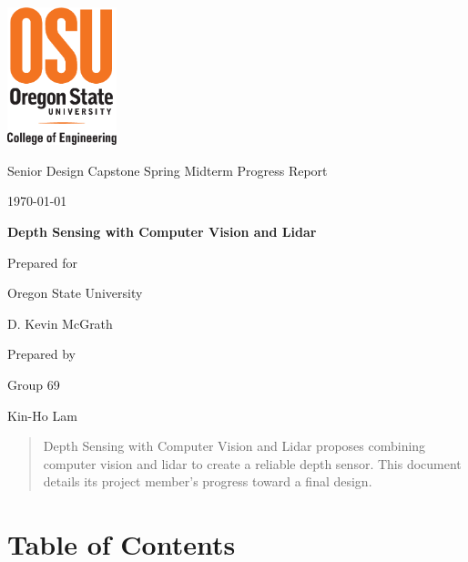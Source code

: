\documentclass[onecolumn, draftclsnofoot,10pt, compsoc]{IEEEtran}
\def \CapstoneTeamName{			}
\def \CapstoneTeamNumber{		69}
\def \GroupMemberOne{			Kin-Ho Lam}
\def \CapstoneProjectName{		Depth Sensing with Computer Vision and Lidar}
\def \CapstoneSponsorCompany{	Oregon State University}
\def \CapstoneSponsorPerson{	D. Kevin McGrath}
\def \DocType{
	Spring Midterm Progress Report
}
\newcommand{\NameSigPair}[1]{\par
	\makebox[2.75in][r]{#1} \hfil 	\makebox[3.25in]{\makebox[2.25in]{\hrulefill} \hfill		\makebox[.75in]{\hrulefill}}
	\par\vspace{-12pt} \textit{\tiny\noindent
		\makebox[2.75in]{} \hfil		\makebox[3.25in]{\makebox[2.25in][r]{Signature} \hfill	\makebox[.75in][r]{Date}}}}
\renewcommand{\NameSigPair}[1]{#1}
\begin{document}
	\begin{titlepage}
		\begin{singlespace}
			\centering
			\includegraphics[height=4cm,natwidth=345,natheight=435]{images/osu_logo.png}
			\hfill 
			\par\vspace{.2in}
			\centering
			\scshape{
				\huge Senior Design Capstone \DocType \par
				{\large\today}\par
				\vspace{.5in}
				\textbf{\Huge\CapstoneProjectName}\par
				\vfill
				{\large Prepared for}\par
				\Huge \CapstoneSponsorCompany\par
				\vspace{5pt}
				{\Large\NameSigPair{\CapstoneSponsorPerson}\par}
				{\large Prepared by }\par
				Group\CapstoneTeamNumber\par
				\CapstoneTeamName\par 
				\vspace{5pt}
				{\large
					\NameSigPair{\GroupMemberOne}\par
				}
				\vspace{20pt}
			}
			\begin{abstract}  
 				Depth Sensing with Computer Vision and Lidar proposes combining computer vision and lidar to create a reliable depth sensor.
				This document details its project member's progress toward a final design.
			\end{abstract}     
		\end{singlespace}
	\end{titlepage}
\section{Table of Contents}
\tableofcontents


\clearpage
\end{document}
